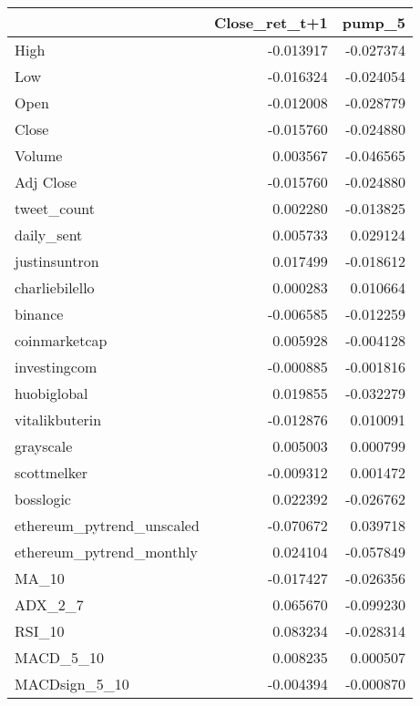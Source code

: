 \begin{tabular}{lrr}
\toprule
{} &  Close\_ret\_t+1 &    pump\_5 \\
\midrule
High                      &      -0.013917 & -0.027374 \\
Low                       &      -0.016324 & -0.024054 \\
Open                      &      -0.012008 & -0.028779 \\
Close                     &      -0.015760 & -0.024880 \\
Volume                    &       0.003567 & -0.046565 \\
Adj Close                 &      -0.015760 & -0.024880 \\
tweet\_count               &       0.002280 & -0.013825 \\
daily\_sent                &       0.005733 &  0.029124 \\
justinsuntron             &       0.017499 & -0.018612 \\
charliebilello            &       0.000283 &  0.010664 \\
binance                   &      -0.006585 & -0.012259 \\
coinmarketcap             &       0.005928 & -0.004128 \\
investingcom              &      -0.000885 & -0.001816 \\
huobiglobal               &       0.019855 & -0.032279 \\
vitalikbuterin            &      -0.012876 &  0.010091 \\
grayscale                 &       0.005003 &  0.000799 \\
scottmelker               &      -0.009312 &  0.001472 \\
bosslogic                 &       0.022392 & -0.026762 \\
ethereum\_pytrend\_unscaled &      -0.070672 &  0.039718 \\
ethereum\_pytrend\_monthly  &       0.024104 & -0.057849 \\
MA\_10                     &      -0.017427 & -0.026356 \\
ADX\_2\_7                   &       0.065670 & -0.099230 \\
RSI\_10                    &       0.083234 & -0.028314 \\
MACD\_5\_10                 &       0.008235 &  0.000507 \\
MACDsign\_5\_10             &      -0.004394 & -0.000870 \\

\end{tabular}
